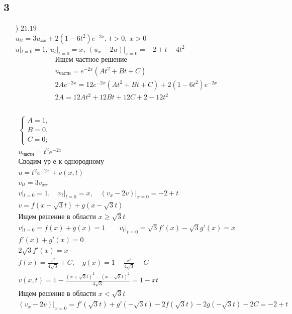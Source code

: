 \subsection{3}
\begin{enumerate}
  \item[\text{а})] $21.19$ \\ $u_{tt}=3u_{xx}+2(1-6t^{2})e^{-2x}, \ t>0, \ x>0$ \\
    $u|_{t=0}=1, \ u_{t}|_{t=0}=x, \ (u_{x}-2u)|_{x=0}=-2+t-4t^{2}$ \\
    \begin{gather*}
      \text{Ищем частное решение} \\
    u_{\text{частн}} = e^{-2x}(At^{2}+Bt+C) \\
    2Ae^{-2x}=12e^{-2x}(At^{2}+Bt+C)+2(1-6t^{2})e^{-2x} \\
    2A=12At^{2}+12Bt+12C+2-12t^{2} \\
    \end{gather*} \\
    \begin{gather*}
    \begin{cases}
      A = 1, \\ B = 0, \\ C = 0;
    \end{cases} \\
    u_{\text{частн}} = t^{2}e^{-2x} \\
    \text{Сводим ур-е к однородному} \\
    u = t^{2}e^{-2x}+v(x,t) \\
    v_{tt}=3v_{xx} \\ v|_{t=0}=1, \quad v_{t}|_{t=0}=x, \quad
    (v_{x}-2v)|_{x=0}=-2+t \\
    v = f(x +\sqrt{3}t)+g(x-\sqrt{3}t) \\
    \text{Ищем решение в области $x \geq \sqrt{3}t$ }\\
    v|_{t=0}=f(x)+g(x)=1 \qquad v_{t}|_{t=0}=\sqrt{3}f'(x)-\sqrt{3}g'(x)=x \\
    f'(x)+g'(x)=0 \\
    2 \sqrt{3}f'(x) = x\\ 
    \boxed{f(x)= \frac{x^{2}}{4 \sqrt{3}} + C, \quad g(x) =1 - \frac{x^{2}}{4 \sqrt{3}} - C}\\
    v(x,t) = 1 - \frac{(x+ \sqrt{3}t)^{2}-(x - \sqrt{3}t)^{2}}{4 \sqrt{3}} = 1 -xt \\
    \text{Ищем решение в области $x < \sqrt{3}t$} \\
    (v_{x}-2v)|_{x=0}=f'(\sqrt{3}t)+g'(-\sqrt{3}t)-2f(\sqrt{3}t)-2g(-\sqrt{3}t)-2C=-2+t \\

\end{gather*}
\end{enumerate}
